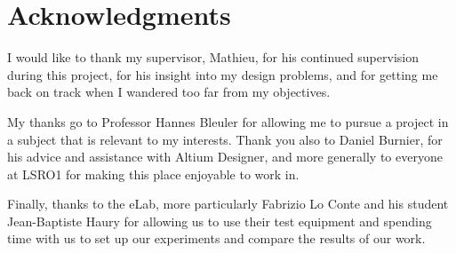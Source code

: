 




\begingroup
\let\clearpage\relax
\let\cleardoublepage\relax
\let\cleardoublepage\relax
\chapter*{Acknowledgments}

I would like to thank my supervisor, Mathieu, for his continued supervision
during this project, for his insight into my design problems, and for getting me
back on track when I wandered too far from my objectives.

My thanks go to Professor Hannes Bleuler for allowing me to pursue a project in
a subject that is relevant to my interests. Thank you also to Daniel Burnier,
for his advice and assistance with Altium Designer, and more generally to
everyone at LSRO1 for making this place enjoyable to work in.

Finally, thanks to the eLab, more particularly Fabrizio Lo Conte and his student
Jean-Baptiste Haury for allowing us to use their test equipment and spending
time with us to set up our experiments and compare the results of our work.

\bigskip


\endgroup



